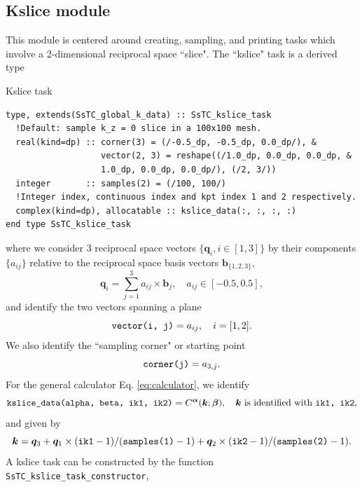\documentclass[10pt,a4paper]{article}
\begin{document}
\subsection{Kslice module}
This module is centered around creating, sampling, and printing tasks which involve a 2-dimensional reciprocal space ``slice". The ``kslice" task is a derived type
\begin{codebox}{Kslice task}
\begin{lstlisting}[caption={Derived type corresponding to a kslice task.},captionpos=b]
type, extends(SsTC_global_k_data) :: SsTC_kslice_task
  !Default: sample k_z = 0 slice in a 100x100 mesh.
  real(kind=dp) :: corner(3) = (/-0.5_dp, -0.5_dp, 0.0_dp/), &
                   vector(2, 3) = reshape((/1.0_dp, 0.0_dp, 0.0_dp, &
                   1.0_dp, 0.0_dp, 0.0_dp/), (/2, 3/))
  integer       :: samples(2) = (/100, 100/)
  !Integer index, continuous index and kpt index 1 and 2 respectively.
  complex(kind=dp), allocatable :: kslice_data(:, :, :, :)
end type SsTC_kslice_task
\end{lstlisting}
\end{codebox}
where we consider 3 reciprocal space vectors $\{\bm{q}_i, i\in[1, 3]\}$ by their components $\{a_{ij}\}$ relative to the reciprocal space basis vectors $\bm{b}_{\{1, 2, 3\}}$,
\begin{equation}\label{eq:vec_coords_slice}
\bm{q}_i = \sum_{j=1}^3 a_{ij}\times \bm{b}_j, \quad a_{ij}\in\left[-0.5, 0.5\right],
\end{equation}
and identify the two vectors spanning a plane
\begin{equation}
\verb|vector(i, j)| = a_{ij}, \quad i = [1, 2].
\end{equation}
We also identify the ``sampling corner" or starting point
\begin{equation}
\verb|corner(j)| = a_{3, j}.
\end{equation}
For the general calculator Eq. \eqref{eq:calculator}, we identify
\begin{equation}
\verb|kslice_data(alpha, beta, ik1, ik2)| = C^{\bm{\alpha}}(\bm{k}; \bm{\beta}),\quad \bm{k}\text{ is identified with } \verb|ik1, ik2|,
\end{equation}
and given by
\begin{equation}
\bm{k} = \bm{q}_3 + \bm{q}_1\times (\verb|ik1|-1)/(\verb|samples(1)| - 1) + \bm{q}_2\times (\verb|ik2|-1)/(\verb|samples(2)| - 1).
\end{equation}
A kslice task can be constructed by the function \verb|SsTC_kslice_task_constructor|,
\end{document}
